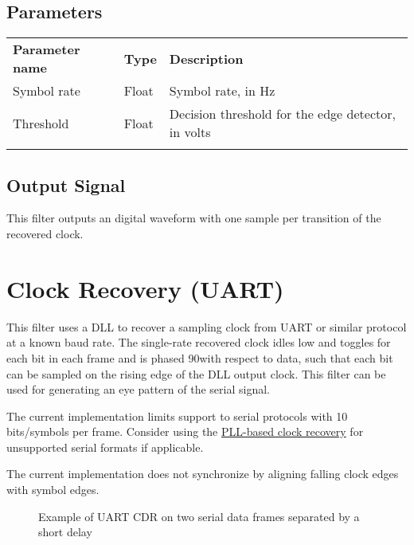 \subsection{Parameters}

\begin{tabularx}{16cm}{llX}
\thickhline
\textbf{Parameter name} & \textbf{Type} & \textbf{Description} \\
\thickhline
Symbol rate & Float & Symbol rate, in Hz\\
\thinhline
Threshold & Float & Decision threshold for the edge detector, in volts\\
\thickhline
\end{tabularx}

\subsection{Output Signal}

This filter outputs an digital waveform with one sample per transition of the recovered clock.

\pagebreak
\section{Clock Recovery (UART)}
\label{filter:cdruart}

This filter uses a DLL to recover a sampling clock from UART or similar protocol at a known baud rate. The single-rate
recovered clock idles low and toggles for each bit in each frame and is phased 90\textdegree with respect to data, such
that each bit can be sampled on the rising edge of the DLL output clock. This filter can be used for generating an eye
pattern of the serial signal.

The current implementation limits support to serial protocols with 10 bits/symbols per frame. Consider using the
\hyperref[filter:cdrpll]{PLL-based clock recovery} for unsupported serial formats if applicable.

The current implementation does not synchronize by aligning falling clock edges with symbol edges.

\begin{figure}[h]
\centering
{}
\caption{Example of UART CDR on two serial data frames separated by a short delay}
\label{filter_cdruart}
\end{figure}

